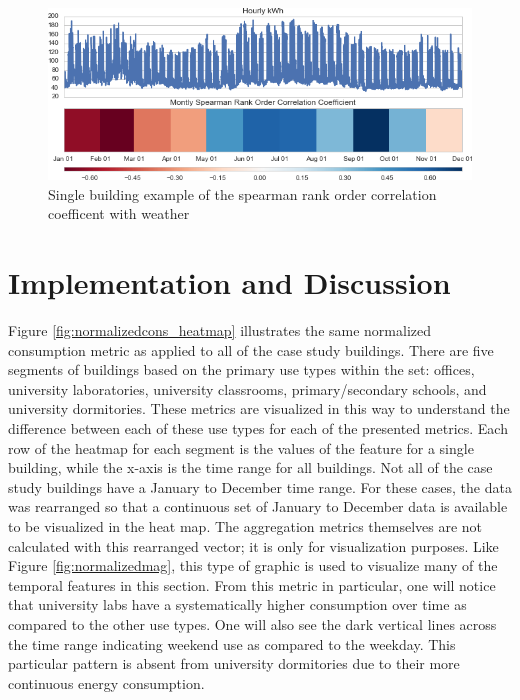 \begin{figure}[ht!]
\begin{center}
\includegraphics[width=1\columnwidth]{figures/spearman_example/spearman_example}
\caption{Single building example of the spearman rank order correlation coefficent with weather
\label{fig:spearman_singlebuilding}%
}
\end{center}
\end{figure}

\section{Implementation and Discussion}
Figure \ref{fig:normalizedcons_heatmap} illustrates the same normalized consumption metric as applied to all of the case study buildings. There are five segments of buildings based on the primary use types within the set: offices, university laboratories, university classrooms, primary/secondary schools, and university dormitories. These metrics are visualized in this way to understand the difference between each of these use types for each of the presented metrics. Each row of the heatmap for each segment is the values of the feature for a single building, while the x-axis is the time range for all buildings. Not all of the case study buildings have a January to December time range. For these cases, the data was rearranged so that a continuous set of January to December data is available to be visualized in the heat map. The aggregation metrics themselves are not calculated with this rearranged vector; it is only for visualization purposes. Like Figure \ref{fig:normalizedmag}, this type of graphic is used to visualize many of the temporal features in this section. From this metric in particular, one will notice that university labs have a systematically higher consumption over time as compared to the other use types. One will also see the dark vertical lines across the time range indicating weekend use as compared to the weekday. This particular pattern is absent from university dormitories due to their more continuous energy consumption.

